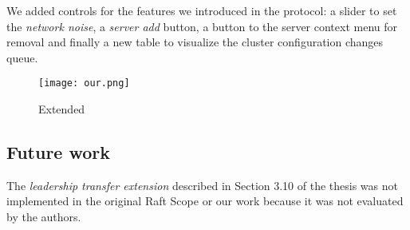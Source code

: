 We added controls for the features we introduced in the protocol: a slider to set the \emph{network noise}, a \emph{server add} button, a button to the server context menu for removal and finally a new table to visualize the cluster configuration changes queue.

\begin{figure*}[h]
    \centering
    \texttt{[image: our.png]}
    \caption{Extended}\label{fig:final}
\end{figure*}

\subsection{Future work}
The \emph{leadership transfer extension} described in Section 3.10 of the thesis
was not implemented in the original Raft Scope or our work because it was not evaluated by the authors.